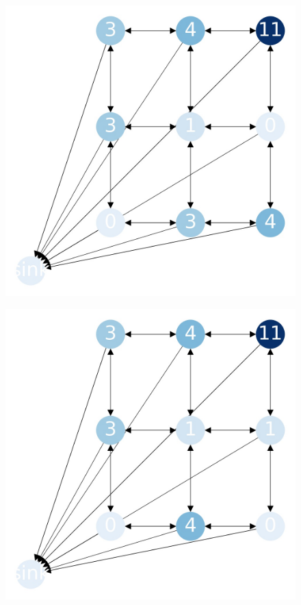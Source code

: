 \documentclass{beamer}
\begin{document}
\begin{frame}
  \begin{figure}[h!]
    \centering
      \includegraphics[scale=0.25]{sandpile_22}
  \end{figure}
\end{frame}


\begin{frame}
  \begin{figure}[h!]
    \centering
      \includegraphics[scale=0.25]{sandpile_23}
  \end{figure}
\end{frame}
\end{document}
